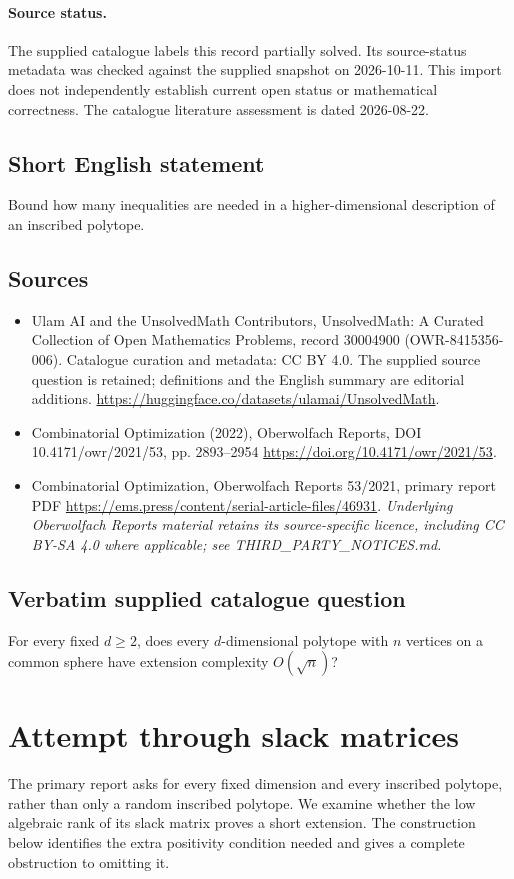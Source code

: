 \documentclass[11pt]{article}
\begin{document}
\paragraph{Source status.}
The supplied catalogue labels this record partially solved. Its source-status metadata was checked against the supplied snapshot on 2026-10-11. This import does not independently establish current open status or mathematical correctness. The catalogue literature assessment is dated 2026-08-22.
\subsection{Short English statement}
Bound how many inequalities are needed in a higher-dimensional description of an inscribed polytope.
\subsection{Sources}
\begin{itemize}
\item[S1] Ulam AI and the UnsolvedMath Contributors, UnsolvedMath: A Curated Collection of Open Mathematics Problems, record 30004900 (OWR-8415356-006). Catalogue curation and metadata: CC BY 4.0. The supplied source question is retained; definitions and the English summary are editorial additions.
\url{https://huggingface.co/datasets/ulamai/UnsolvedMath}.
\item[S2] Combinatorial Optimization (2022), Oberwolfach Reports, DOI 10.4171/owr/2021/53, pp. 2893--2954
\url{https://doi.org/10.4171/owr/2021/53}.
\item[S3] Combinatorial Optimization, Oberwolfach Reports 53/2021, primary report PDF
\url{https://ems.press/content/serial-article-files/46931}.
\textit{Underlying Oberwolfach Reports material retains its source-specific licence, including CC BY-SA 4.0 where applicable; see THIRD\_PARTY\_NOTICES.md.}
\end{itemize}
\subsection{Verbatim supplied catalogue question}
For every fixed $d\geq2$, does every $d$-dimensional polytope with $n$ vertices on a common sphere have extension complexity $O(\sqrt n)$?

\section{Attempt through slack matrices}
The primary report asks for every fixed dimension and every inscribed
polytope, rather than only a random inscribed polytope. We examine
whether the low algebraic rank of its slack matrix proves a short
extension. The construction below identifies the extra positivity
condition needed and gives a complete obstruction to omitting it.
\end{document}
